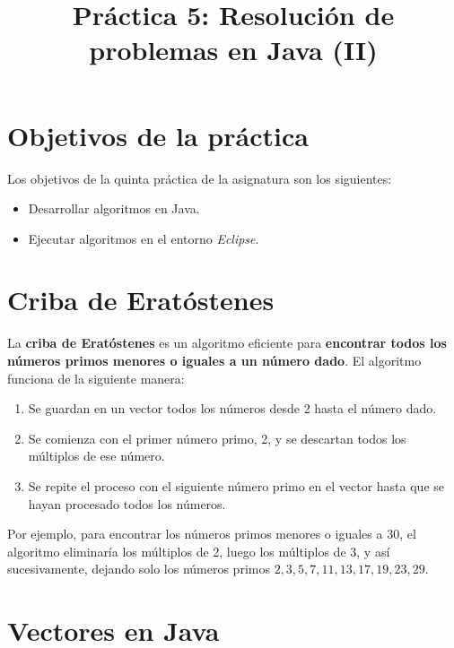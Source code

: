 \documentclass[
  spanish,
  11pt,
  a4paper,
  DIV=11,
  numbers=noendperiod]{scrartcl}
\title{Práctica 5: Resolución de problemas en Java (II)}
\author{}
\date{}
\providecommand{\tightlist}{\setlength{\itemsep}{0pt}\setlength{\parskip}{0pt}}
\begin{document}
\maketitle

\renewcommand*\contentsname{Tabla de contenidos}
{
\hypersetup{linkcolor=}
\setcounter{tocdepth}{2}
\tableofcontents
}

\clearpage

\section{Objetivos de la práctica}\label{objetivos-de-la-practica}

Los objetivos de la quinta práctica de la asignatura son los siguientes:

\begin{itemize}
\tightlist
\item Desarrollar algoritmos en Java.
\item Ejecutar algoritmos en el entorno \emph{Eclipse}.
\end{itemize}

\section{Criba de Eratóstenes}\label{criba-de-eratostenes}

La \textbf{criba de Eratóstenes} es un algoritmo eficiente para \textbf{encontrar todos los números primos menores o iguales a un número dado}. El algoritmo funciona de la siguiente manera:

\begin{enumerate}
\tightlist
\item Se guardan en un vector todos los números desde 2 hasta el número dado.
\item Se comienza con el primer número primo, 2, y se descartan todos los múltiplos de ese número.
\item Se repite el proceso con el siguiente número primo en el vector hasta que se hayan procesado todos los números.
\end{enumerate}

Por ejemplo, para encontrar los números primos menores o iguales a 30, el algoritmo eliminaría los múltiplos de 2, luego los múltiplos de 3, y así sucesivamente, dejando solo los números primos \(2, 3, 5, 7, 11, 13, 17, 19, 23, 29\).

\section{Vectores en Java}\label{vectores-en-java}
\end{document}
